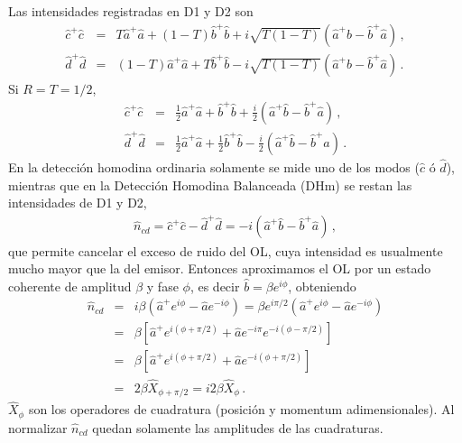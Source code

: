 \documentclass[twocolumn,aps,eqsecnum,showkeys,amsmath]{revtex4}
\begin{document}
Las intensidades registradas en D1 y D2 son 
%
\begin{eqnarray*}
\hat{c}^+ \hat{c} &=& T \hat{a}^+ \hat{a} +(1-T) \hat{b}^+ \hat{b} 
	+i \sqrt{T(1-T)}  \left( \hat{a}^+ \hat{b} -\hat{b}^+ \hat{a}  \right) \,, \\ 
\hat{d}^+ \hat{d} &=& (1-T) \hat{a}^+ \hat{a} +T \hat{b}^+ \hat{b} 
	-i \sqrt{T(1-T)}  \left( \hat{a}^+ \hat{b} -\hat{b}^+ \hat{a}  \right) \,. 
\end{eqnarray*}
Si $R=T=1/2$, 
%
\begin{subequations}
\begin{eqnarray}
\hat{c}^+ \hat{c} &=& \frac{1}{2} \hat{a}^+ \hat{a} + \hat{b}^+ \hat{b} 
	+\frac{i}{2} \left( \hat{a}^+ \hat{b} -\hat{b}^+ \hat{a}  \right) \,, \\ 
\hat{d}^+ \hat{d} &=& \frac{1}{2} \hat{a}^+ \hat{a} +\frac{1}{2} \hat{b}^+ \hat{b} 
	- \frac{i}{2} \left( \hat{a}^+ \hat{b} -\hat{b}^+ \hat{a}  \right) \,. 
\end{eqnarray}
\end{subequations}
En la detecci\'on homodina ordinaria solamente se mide uno de los 
modos ($\hat{c}$ \'o $\hat{d}$), mientras que en la Detecci\'on Homodina 
Balanceada (DHm) se restan las intensidades de D1 y D2, 
%
\begin{eqnarray}
\hat{n}_{cd} = \hat{c}^+ \hat{c} - \hat{d}^+ \hat{d} 
= - i \left( \hat{a}^+ \hat{b} -\hat{b}^+ \hat{a}  \right)  \,,  
\end{eqnarray}
que permite cancelar el exceso de ruido del OL, cuya intensidad es 
usualmente mucho mayor que la del emisor. Entonces aproximamos el 
OL por un estado coherente de amplitud $\beta$ y fase $\phi$, es decir 
$\hat{b} = \beta e^{i\phi}$, obteniendo 
%
\begin{eqnarray}
\hat{n}_{cd} &=& i \beta \left( \hat{a}^+ e^{i\phi} - \hat{a} e^{-i \phi}  \right) 
	= \beta e^{i \pi/2} \left( \hat{a}^+ e^{i\phi} - \hat{a} e^{-i \phi}  \right)
	\nonumber \\
&=& \beta \left[ \hat{a}^+ e^{i(\phi +\pi/2)} 
	+ \hat{a} e^{-i\pi} e^{-i( \phi -\pi/2)}  \right] 	\nonumber \\ 
&=& \beta \left[ \hat{a}^+ e^{i(\phi +\pi/2)} 
	+ \hat{a} e^{-i( \phi +\pi/2)}  \right] 	\nonumber \\ 	
&=& 2 \beta \hat{X}_{\phi +\pi/2} = i2\beta \hat{X}_{\phi} \,. 
\end{eqnarray}
$\hat{X}_{\phi}$ son los operadores de cuadratura (posici\'on y momentum adimensionales). Al normalizar $\hat{n}_{cd}$ quedan solamente las 
amplitudes de las cuadraturas. 
\end{document}
